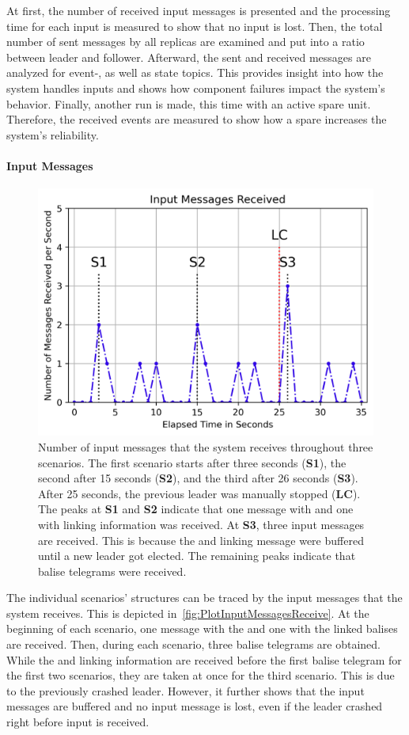At first, the number of received input messages is presented and the processing time for each input is measured to show that no input is lost.
Then, the total number of sent messages by all replicas are examined and put into a ratio between leader and follower.
Afterward, the sent and received messages are analyzed for event-, as well as state topics.
This provides insight into how the system handles inputs and shows how component failures impact the system's behavior.
Finally, another run is made, this time with an active spare unit.
Therefore, the received events are measured to show how a spare increases the system's reliability.

\paragraph{Input Messages}

\begin{figure}[!hb]
	\centering
	\includegraphics[width=0.8\linewidth]{images/plots/InputMessagesReceive}
	\caption{Number of input messages that the system receives throughout three scenarios. The first scenario starts after three seconds (\textbf{S1}), the second after 15 seconds (\textbf{S2}), and the third after 26 seconds (\textbf{S3}). After 25 seconds, the previous leader was manually stopped (\textbf{LC}). The peaks at \textbf{S1} and \textbf{S2} indicate that one message with  and one with linking information was received. At \textbf{S3}, three input messages are received. This is because the  and linking message were buffered until a new leader got elected. The remaining peaks indicate that balise telegrams were received.}
	\label{fig:PlotInputMessagesReceive}
\end{figure}

The individual scenarios' structures can be traced by the input messages that the system receives.
This is depicted in~\autoref{fig:PlotInputMessagesReceive}.
At the beginning of each scenario, one message with the  and one with the linked balises are received.
Then, during each scenario, three balise telegrams are obtained.
While the  and linking information are received before the first balise telegram for the first two scenarios, they are taken at once for the third scenario.
This is due to the previously crashed leader.
However, it further shows that the input messages are buffered and no input message is lost, even if the leader crashed right before input is received.
\\

